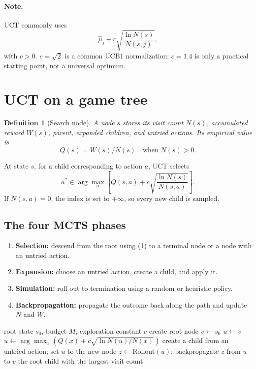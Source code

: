\documentclass[conference]{IEEEtran}
\newtheorem{definition}{Definition}[section]
\begin{document}
\paragraph{Note.} UCT commonly uses
\[
\widehat\mu_j+c\sqrt{\frac{\ln N(s)}{N(s,j)}},
\]
with $c>0$. $c=\sqrt2$ is a common UCB1 normalization; $c=1.4$ is only a
practical starting point, not a universal optimum.

\section{UCT on a game tree}
\begin{definition}[Search node]
A node $s$ stores its visit count $N(s)$, accumulated reward $W(s)$, parent,
expanded children, and untried actions. Its empirical value is
\[
Q(s)=W(s)/N(s)\quad\text{when }N(s)>0.
\]
\end{definition}

At state $s$, for a child corresponding to action $a$, UCT selects
\[
a^*\in\arg\max_a\left[Q(s,a)+c\sqrt{\frac{\ln N(s)}{N(s,a)}}\right].
\tag{1}
\]
If $N(s,a)=0$, the index is set to $+\infty$, so every new child is sampled.

\subsection{The four MCTS phases}
\begin{enumerate}[label=\arabic*.]
\item \textbf{Selection:} descend from the root using (1) to a terminal node or
a node with an untried action.
\item \textbf{Expansion:} choose an untried action, create a child, and apply it.
\item \textbf{Simulation:} roll out to termination using a random or heuristic policy.
\item \textbf{Backpropagation:} propagate the outcome back along the path and update
$N$ and $W$.
\end{enumerate}

\begin{algorithm}[h]
\caption{MCTS--UCT for a two-player game}
\begin{algorithmic}[1]
\Require root state $s_0$, budget $M$, exploration constant $c$
\State create root node $v\gets s_0$
  \State $u\gets v$
    \State $u\gets\arg\max_x\left(Q(x)+c\sqrt{\ln N(u)/N(x)}\right)$
  \EndWhile
    \State create a child from an untried action; set $u$ to the new node
  \EndIf
  \State $z\gets\mathrm{Rollout}(u)$; backpropagate $z$ from $u$ to $v$
\EndFor
\State \Return the root child with the largest visit count
\end{algorithmic}
\end{algorithm}
\end{document}
